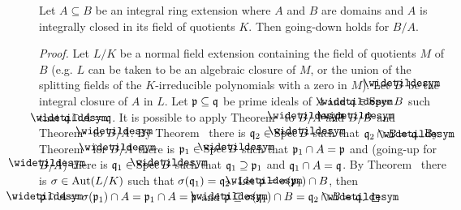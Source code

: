 \documentclass[a4paper,parskip=half,numbers=enddot, DIV=12]{scrreprt}
\begin{document}
	\begin{thm}
		Let $A\subseteq B$ be an integral ring extension where $A$ and $B$ are domains and $A$ is integrally closed in its field of quotients $K$. Then going-down holds for $B/A$.
	\end{thm}
	\begin{proof}
		Let $L/K$ be a normal field extension containing the field of quotients $M$ of $B$ (e.g. $L$ can be taken to be an algebraic closure of $M$, or the union of the splitting fields of the $K$-irreducible polynomials with a zero in $M$). Let $\snake B$ be the integral closure of $A$ in $L$. Let $\mathfrak{p}\subseteq \mathfrak{q}$ be prime ideals of $A$ and $\snake \qq\in\Spec B$ such that $\snake \qq\cap A = \qq$. It is possible to apply Theorem~ to $\snake B/A$ and $\snake B/B$ and Theorem~ to $\snake B/A$. By Theorem~ there is $\qq_2\in\Spec \snake B$ such that $\qq_2\cap B = \snake \qq$. By Theorem~ for $\snake B/A$ there is $\pp_1\in\Spec \snake B$ such that $\mathfrak{p}_1\cap A = \mathfrak{p}$ and (going-up for $\snake B/A$) there is $\qq_1\in \Spec \snake B$ such that $\mathfrak{q}_1\supseteq \mathfrak{p}_1$ and $\mathfrak{q}_1\cap A =\mathfrak{q}$. By Theorem~ there is $\sigma\in\operatorname{Aut}(L/K)$ such that $\sigma(\mathfrak{q}_1) = \mathfrak{q}_2$. Let $\snake\pp = \sigma(\pp_1)\cap B$, then $\snake\pp\cap A = \sigma(\pp_1)\cap A = \pp_1\cap A = \pp$ and $\snake\pp\subseteq \sigma(\qq_1)\cap B = \qq_2\cap B = \snake \qq$.
	\end{proof}
\end{document}
